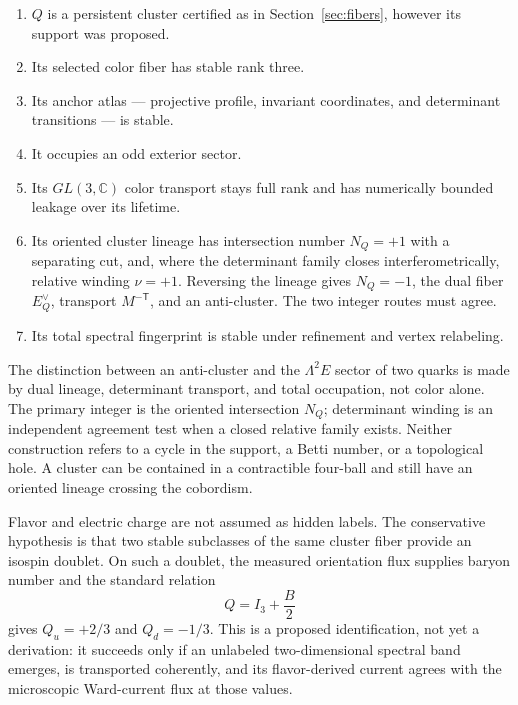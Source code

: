 \documentclass[11pt,letterpaper]{article}
\begin{document}
\begin{enumerate}
  \item $Q$ is a persistent cluster certified as in
    Section~\ref{sec:fibers}, however its support was proposed.
  \item Its selected color fiber has stable rank three.
  \item Its anchor atlas --- projective profile, invariant coordinates, and
    determinant transitions --- is stable.
  \item It occupies an odd exterior sector.
  \item Its $GL(3,\mathbb C)$ color transport stays full rank and has
    numerically bounded leakage over its lifetime.
  \item Its oriented cluster lineage has intersection number $N_Q=+1$ with a
    separating cut, and, where the determinant family closes
    interferometrically, relative winding $\nu=+1$. Reversing the lineage
    gives $N_Q=-1$, the dual fiber $E_Q^\vee$, transport
    $M^{-\mathsf T}$, and an anti-cluster. The two integer routes must agree.
  \item Its total spectral fingerprint is stable under refinement and vertex
    relabeling.
\end{enumerate}

The distinction between an anti-cluster and the $\Lambda^2E$ sector of two
quarks is made by dual lineage, determinant transport, and total occupation,
not color alone. The primary integer is the oriented intersection $N_Q$;
determinant winding is an independent agreement test when a closed relative
family exists. Neither construction refers to a cycle in the support, a Betti
number, or a topological hole. A cluster can be contained in a contractible
four-ball and still have an oriented lineage crossing the cobordism.

Flavor and electric charge are not assumed as hidden labels. The conservative
hypothesis is that two stable subclasses of the same cluster fiber provide an
isospin doublet. On such a doublet, the measured orientation flux supplies
baryon number and the standard relation
\begin{equation*}
  Q=I_{3}+\frac{B}{2}
\end{equation*}
gives $Q_{u}=+2/3$ and $Q_{d}=-1/3$. This is a proposed identification, not
yet a derivation: it succeeds only if an unlabeled two-dimensional spectral
band emerges, is transported coherently, and its flavor-derived current agrees
with the microscopic Ward-current flux at those values.
\end{document}
